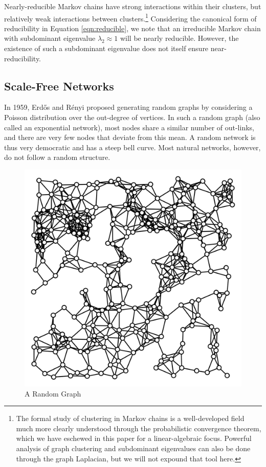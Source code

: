 \documentclass[11pt,letterpaper]{amsart}
\begin{document}
Nearly-reducible Markov chains have strong interactions within their clusters,
but relatively weak interactions between clusters.\footnote{The formal study of
  clustering in Markov chains is a well-developed field much more clearly
  understood through the probabilistic convergence theorem, which we have
  eschewed in this paper for a linear-algebraic focus. Powerful analysis of
  graph clustering and subdominant eigenvalues can also be done through the
  graph Laplacian, but we will not expound that tool here.} Considering the
canonical form of reducibility in Equation \eqref{eqn:reducible}, we note that
an irreducible Markov chain with subdominant eigenvalue $\lambda_2 \approx 1$
will be nearly reducible. However, the existence of such a subdominant
eigenvalue does not itself ensure near-reducibility.


\subsection{Scale-Free Networks}
In 1959, Erdős and Rényi proposed generating random graphs by considering a
Poisson distribution over the out-degree of vertices. In such a random graph
(also called an exponential network), most nodes share a similar number of
out-links, and there are very few nodes that deviate from this mean. A random
network is thus very democratic and has a steep bell curve. Most natural
networks, however, do not follow a random structure.
\begin{figure}
  \centering
  \includegraphics[scale=0.15]{random-graph}
  \caption{A Random Graph \cite{RandomGeometricGraph}}
  \label{fig:random}
\end{figure}
\end{document}

